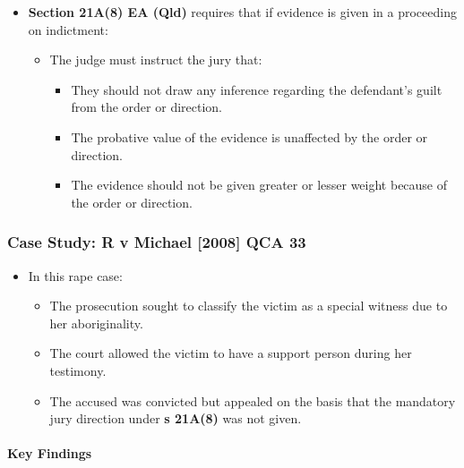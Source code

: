 \begin{itemize}
\tightlist
\item
  \textbf{Section 21A(8) EA (Qld)} requires that if evidence is given in
  a proceeding on indictment:

  \begin{itemize}
  \tightlist
  \item
    The judge must instruct the jury that:

    \begin{itemize}
    \tightlist
    \item
      They should not draw any inference regarding the defendant's guilt
      from the order or direction.
    \item
      The probative value of the evidence is unaffected by the order or
      direction.
    \item
      The evidence should not be given greater or lesser weight because
      of the order or direction.
    \end{itemize}
  \end{itemize}
\end{itemize}

\subsubsection{Case Study: R v Michael {[}2008{]} QCA
33}\label{case-study-r-v-michael-2008-qca-33}

\begin{itemize}
\tightlist
\item
  In this rape case:

  \begin{itemize}
  \tightlist
  \item
    The prosecution sought to classify the victim as a special witness
    due to her aboriginality.
  \item
    The court allowed the victim to have a support person during her
    testimony.
  \item
    The accused was convicted but appealed on the basis that the
    mandatory jury direction under \textbf{s 21A(8)} was not given.
  \end{itemize}
\end{itemize}

\paragraph{Key Findings}\label{key-findings}

